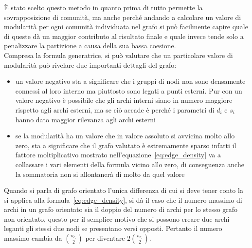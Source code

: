 È stato scelto questo metodo in quanto prima di tutto permette la sovrapposizione di comunità, ma anche perché andando a calcolare un valore di modularità per ogni comunità individuata nel grafo si può facilmente capire quale di queste dà un maggior contributo al risultato finale e quale invece tende solo a penalizzare la partizione a causa della sua bassa coesione.\\
Compresa la formula generatrice, si può valutare che un particolare valore di modularità può rivelare  due importanti dettagli del grafo:
\begin{itemize}
	\item un valore negativo sta a significare che i gruppi di nodi non sono densamente connessi al loro interno ma piuttosto sono legati a punti esterni. Pur con un valore negativo è possibile che gli archi interni siano in numero maggiore rispetto agli archi esterni, ma se ciò accade è perché i parametri di $d_i$ e $s_i$ hanno dato maggior rilevanza agli archi esterni
	\item se la modularità ha un valore che in valore assoluto si avvicina molto allo zero, sta a significare che il grafo valutato è estremamente sparso infatti il fattore moltiplicativo mostrato nell'equazione~\ref{eq:edge_density} va a collassare i vari elementi della formula vicino allo zero, di conseguenza anche la sommatoria non si allontanerà di molto da quel valore
\end{itemize}
Quando si parla di grafo orientato l'unica differenza di cui si deve tener conto la si applica alla formula~\ref{eq:edge_density}, si dà il caso che il numero massimo di archi in un grafo orientato sia il doppio del numero di archi per lo stesso grafo non orientato, questo per il semplice motivo che si possono creare due archi leganti gli stessi due nodi se presentano versi opposti. Pertanto il numero massimo cambia da $ \displaystyle\binom{n_{c_r}}{2}$ per diventare $\displaystyle 2\binom{n_{c_r}}{2}$.
%
%
